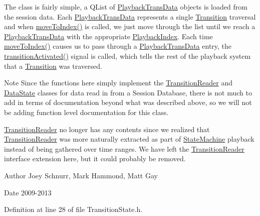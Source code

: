 The class is fairly simple, a Q\-List of \hyperlink{struct_picto_1_1_playback_trans_data}{Playback\-Trans\-Data} objects is loaded from the session data. Each \hyperlink{struct_picto_1_1_playback_trans_data}{Playback\-Trans\-Data} represents a single \hyperlink{class_picto_1_1_transition}{Transition} traversal and when \hyperlink{class_picto_1_1_transition_state_a9a21bdd8867aa905059d4495664735a7}{move\-To\-Index()} is called, we just move through the list until we reach a \hyperlink{struct_picto_1_1_playback_trans_data}{Playback\-Trans\-Data} with the appropriate \hyperlink{struct_picto_1_1_playback_index}{Playback\-Index}. Each time \hyperlink{class_picto_1_1_transition_state_a9a21bdd8867aa905059d4495664735a7}{move\-To\-Index()} causes us to pass through a \hyperlink{struct_picto_1_1_playback_trans_data}{Playback\-Trans\-Data} entry, the \hyperlink{class_picto_1_1_transition_state_a64bfe3dca43f7a2302b8a26a41f9b743}{transition\-Activated()} signal is called, which tells the rest of the playback system that a \hyperlink{class_picto_1_1_transition}{Transition} was traversed.

\begin{DoxyNote}{Note}
Since the functions here simply implement the \hyperlink{class_picto_1_1_transition_reader}{Transition\-Reader} and \hyperlink{class_picto_1_1_data_state}{Data\-State} classes for data read in from a Session Database, there is not much to add in terms of documentation beyond what was described above, so we will not be adding function level documentation for this class.

\hyperlink{class_picto_1_1_transition_reader}{Transition\-Reader} no longer has any contents since we realized that \hyperlink{class_picto_1_1_transition_reader}{Transition\-Reader} was more naturally extracted as part of \hyperlink{class_picto_1_1_state_machine}{State\-Machine} playback instead of being gathered over time ranges. We have left the \hyperlink{class_picto_1_1_transition_reader}{Transition\-Reader} interface extension here, but it could probably be removed. 
\end{DoxyNote}
\begin{DoxyAuthor}{Author}
Joey Schnurr, Mark Hammond, Matt Gay 
\end{DoxyAuthor}
\begin{DoxyDate}{Date}
2009-\/2013 
\end{DoxyDate}


Definition at line 28 of file Transition\-State.\-h.



